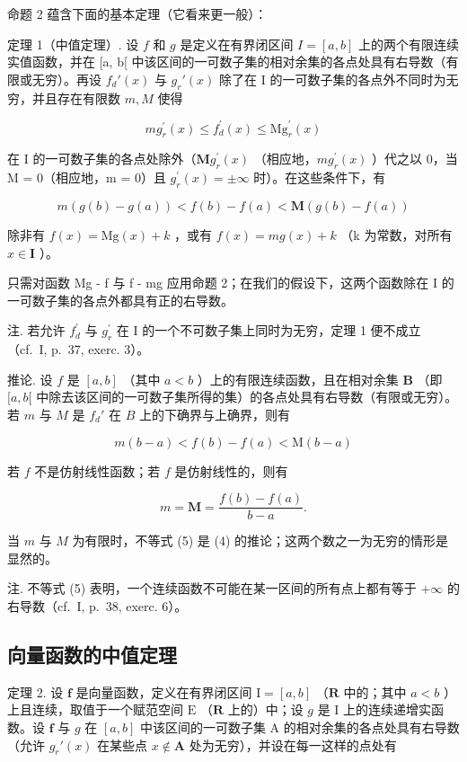 命题 2 蕴含下面的基本定理（它看来更一般）：

定理 1（中值定理）. 设 \(f\) 和 \(g\) 是定义在有界闭区间 \(I = [a, b]\) 上的两个有限连续实值函数，并在 {[}a, b{[} 中该区间的一可数子集的相对余集的各点处具有右导数（有限或无穷）。再设 \(f_d'(x)\) 与 \(g_r'(x)\) 除了在 I 的一可数子集的各点外不同时为无穷，并且存在有限数 \(m, M\) 使得

\[
m g _ {r} ^ {\prime} (x) \leqslant f _ {d} ^ {\prime} (x) \leqslant \mathrm{Mg} _ {r} ^ {\prime} (x)\tag{3}
\]

在 I 的一可数子集的各点处除外（\(\mathbf{M}g_{r}^{\prime}(x)\) （相应地，\(mg_{r}^{\prime}(x)\) ）代之以 0，当 M = 0（相应地，m = 0）且 \(g_{r}^{\prime}(x) = \pm\infty\) 时）。在这些条件下，有

\[
m (g (b) - g (a)) <   f (b) - f (a) <   \mathbf {M} (g (b) - f (a))\tag{4}
\]

除非有 \(f(x) = \mathrm{Mg}(x) + k\) ，或有 \(f(x) = mg(x) + k\) （k 为常数，对所有 \(x \in \mathbf{I}\) ）。

只需对函数 Mg - f 与 f - mg 应用命题 2；在我们的假设下，这两个函数除在 I 的一可数子集的各点外都具有正的右导数。

注. 若允许 \(f_{d}^{\prime}\) 与 \(g_{r}^{\prime}\) 在 I 的一个不可数子集上同时为无穷，定理 1 便不成立（cf.~I, p.~37, exerc. 3）。

推论. 设 \(f\) 是 \([a, b]\) （其中 \(a < b\) ）上的有限连续函数，且在相对余集 \(\mathbf{B}\) （即 \([a, b[\) 中除去该区间的一可数子集所得的集）的各点处具有右导数（有限或无穷）。若 \(m\) 与 \(M\) 是 \(f_d'\) 在 \(B\) 上的下确界与上确界，则有

\[
m (b - a) <   f (b) - f (a) <   \mathrm{M} (b - a)\tag{5}
\]

若 \(f\) 不是仿射线性函数；若 \(f\) 是仿射线性的，则有

\[
m = \mathbf {M} = \frac {f (b) - f (a)}{b - a}.
\]

当 \(m\) 与 \(M\) 为有限时，不等式 (5) 是 (4) 的推论；这两个数之一为无穷的情形是显然的。

注. 不等式 (5) 表明，一个连续函数不可能在某一区间的所有点上都有等于 \(+\infty\) 的右导数（cf.~I, p.~38, exerc. 6）。

\subsection{向量函数的中值定理}

定理 2. 设 \(\mathbf{f}\) 是向量函数，定义在有界闭区间 \(\mathrm{I} = [a, b]\) （\(\mathbf{R}\) 中的；其中 \(a < b\) ）上且连续，取值于一个赋范空间 \(\mathrm{E}\) （\(\mathbf{R}\) 上的）中；设 \(g\) 是 \(\mathrm{I}\) 上的连续递增实函数。设 \(\mathbf{f}\) 与 \(g\) 在 \([a, b]\) 中该区间的一可数子集 A 的相对余集的各点处具有右导数（允许 \(g_r'(x)\) 在某些点 \(x \notin \mathbf{A}\) 处为无穷），并设在每一这样的点处有

